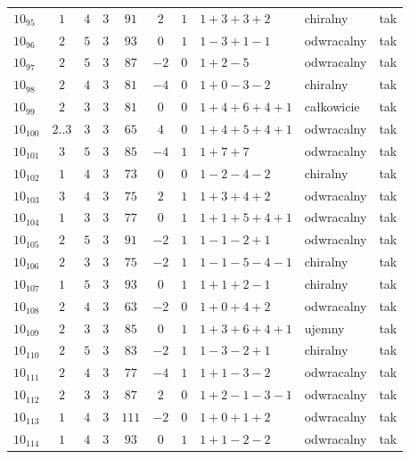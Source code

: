 \begin{longtable}{lccccccllc}
$10_{95}$  & $1$   & $4$ & $3$ & $91$  & $2$  & $1$ & $1+3+3+2$     & chiralny   & tak \\
$10_{96}$  & $2$   & $5$ & $3$ & $93$  & $0$  & $1$ & $1-3+1-1$     & odwracalny & tak \\
$10_{97}$  & $2$   & $5$ & $3$ & $87$  & $-2$ & $0$ & $1+2-5$       & odwracalny & tak \\
$10_{98}$  & $2$   & $4$ & $3$ & $81$  & $-4$ & $0$ & $1+0-3-2$     & chiralny   & tak \\
$10_{99}$  & $2$   & $3$ & $3$ & $81$  & $0$  & $0$ & $1+4+6+4+1$   & całkowicie & tak \\
$10_{100}$ & $2..3$ & $3$ & $3$ & $65$  & $4$  & $0$ & $1+4+5+4+1$   & odwracalny & tak \\
$10_{101}$ & $3$   & $5$ & $3$ & $85$  & $-4$ & $1$ & $1+7+7$       & odwracalny & tak \\
$10_{102}$ & $1$   & $4$ & $3$ & $73$  & $0$  & $0$ & $1-2-4-2$     & chiralny   & tak \\
$10_{103}$ & $3$   & $4$ & $3$ & $75$  & $2$  & $1$ & $1+3+4+2$     & odwracalny & tak \\
$10_{104}$ & $1$   & $3$ & $3$ & $77$  & $0$  & $1$ & $1+1+5+4+1$   & odwracalny & tak \\
$10_{105}$ & $2$   & $5$ & $3$ & $91$  & $-2$ & $1$ & $1-1-2+1$     & odwracalny & tak \\
$10_{106}$ & $2$   & $3$ & $3$ & $75$  & $-2$ & $1$ & $1-1-5-4-1$   & chiralny   & tak \\
$10_{107}$ & $1$   & $5$ & $3$ & $93$  & $0$  & $1$ & $1+1+2-1$     & chiralny   & tak \\
$10_{108}$ & $2$   & $4$ & $3$ & $63$  & $-2$ & $0$ & $1+0+4+2$     & odwracalny & tak \\
$10_{109}$ & $2$   & $3$ & $3$ & $85$  & $0$  & $1$ & $1+3+6+4+1$   & ujemny     & tak \\
$10_{110}$ & $2$   & $5$ & $3$ & $83$  & $-2$ & $1$ & $1-3-2+1$     & chiralny   & tak \\
$10_{111}$ & $2$   & $4$ & $3$ & $77$  & $-4$ & $1$ & $1+1-3-2$     & odwracalny & tak \\
$10_{112}$ & $2$   & $3$ & $3$ & $87$  & $2$  & $0$ & $1+2-1-3-1$   & odwracalny & tak \\
$10_{113}$ & $1$   & $4$ & $3$ & $111$ & $-2$ & $0$ & $1+0+1+2$     & odwracalny & tak \\
$10_{114}$ & $1$   & $4$ & $3$ & $93$  & $0$  & $1$ & $1+1-2-2$     & odwracalny & tak \\

\end{longtable}
